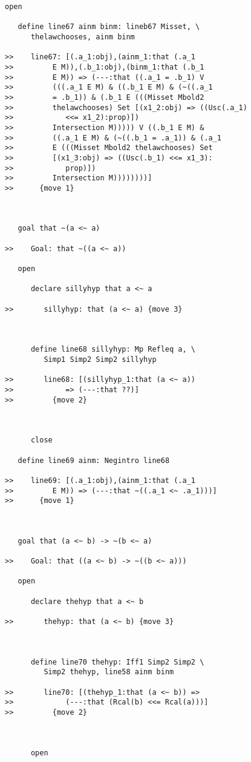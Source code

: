 \documentclass[12pt]{article}
\begin{document}
\begin{verbatim}
open

   define line67 ainm binm: lineb67 Misset, \
      thelawchooses, ainm binm

>>    line67: [(.a_1:obj),(ainm_1:that (.a_1
>>         E M)),(.b_1:obj),(binm_1:that (.b_1
>>         E M)) => (---:that ((.a_1 = .b_1) V
>>         (((.a_1 E M) & ((.b_1 E M) & (~((.a_1
>>         = .b_1)) & (.b_1 E (((Misset Mbold2
>>         thelawchooses) Set [(x1_2:obj) => ((Usc(.a_1)
>>            <<= x1_2):prop)])
>>         Intersection M))))) V ((.b_1 E M) &
>>         ((.a_1 E M) & (~((.b_1 = .a_1)) & (.a_1
>>         E (((Misset Mbold2 thelawchooses) Set
>>         [(x1_3:obj) => ((Usc(.b_1) <<= x1_3):
>>            prop)])
>>         Intersection M))))))))]
>>      {move 1}



   goal that ~(a <~ a)

>>    Goal: that ~((a <~ a))

   open

      declare sillyhyp that a <~ a

>>       sillyhyp: that (a <~ a) {move 3}



      define line68 sillyhyp: Mp Refleq a, \
         Simp1 Simp2 Simp2 sillyhyp

>>       line68: [(sillyhyp_1:that (a <~ a))
>>            => (---:that ??)]
>>         {move 2}



      close

   define line69 ainm: Negintro line68

>>    line69: [(.a_1:obj),(ainm_1:that (.a_1
>>         E M)) => (---:that ~((.a_1 <~ .a_1)))]
>>      {move 1}



   goal that (a <~ b) -> ~(b <~ a)

>>    Goal: that ((a <~ b) -> ~((b <~ a)))

   open

      declare thehyp that a <~ b

>>       thehyp: that (a <~ b) {move 3}



      define line70 thehyp: Iff1 Simp2 Simp2 \
         Simp2 thehyp, line58 ainm binm

>>       line70: [(thehyp_1:that (a <~ b)) =>
>>            (---:that (Rcal(b) <<= Rcal(a)))]
>>         {move 2}



      open


\end{verbatim}
\end{document}
